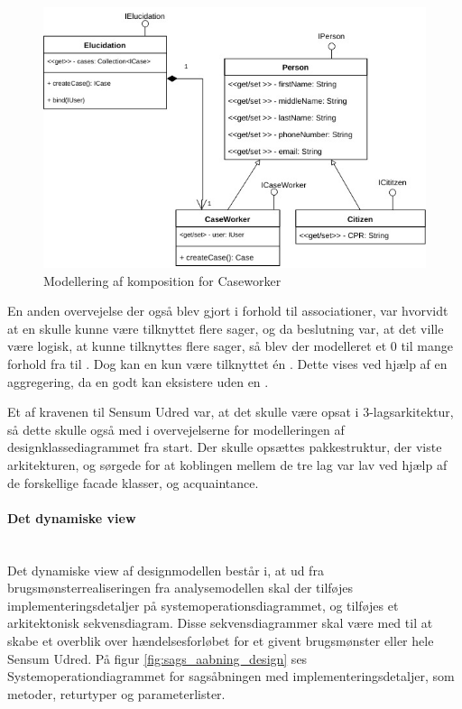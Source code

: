 \documentclass[../../main.tex]{subfiles}
\begin{document}
\begin{figure}[H]
  \centering
  \includegraphics[scale=.4]{figurer/Komposition.jpeg}
  \caption{Modellering af komposition for Caseworker}
  \label{fig:komposition}
\end{figure}

En anden overvejelse der også blev gjort i forhold til associationer, var hvorvidt at en  skulle kunne være tilknyttet flere sager, og da beslutning var, at det ville være logisk, at  kunne tilknyttes flere sager, så blev der modelleret et 0 til mange forhold fra  til . Dog kan en   kun være tilknyttet én . Dette vises ved hjælp af en aggregering, da en  godt kan eksistere uden en .

Et af kravenen til Sensum Udred var, at det skulle være opsat i 3-lagsarkitektur, så dette skulle også med i overvejelserne for modelleringen af designklassediagrammet fra start. Der skulle opsættes pakkestruktur, der viste arkitekturen, og sørgede for at koblingen mellem de tre lag var lav ved hjælp af de forskellige facade klasser, og acquaintance. 

\paragraph{Det dynamiske view}\mbox{} \\
Det dynamiske view af designmodellen består i, at ud fra brugsmønsterrealiseringen fra analysemodellen skal der tilføjes implementeringsdetaljer på systemoperationsdiagrammet, og tilføjes et arkitektonisk sekvensdiagram. Disse sekvensdiagrammer skal være med til at skabe et overblik over hændelsesforløbet for et givent brugsmønster eller hele Sensum Udred. På figur \ref{fig:sags_aabning_design} ses Systemoperationdiagrammet for sagsåbningen med implementeringsdetaljer, som metoder, returtyper og parameterlister.
\end{document}
